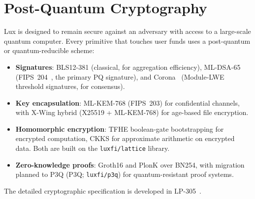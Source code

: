 \section{Post-Quantum Cryptography}


Lux is designed to remain secure against an adversary with access to
a large-scale quantum computer. Every primitive that touches user
funds uses a post-quantum or quantum-reducible scheme:

\begin{itemize}[nosep]
  \item \textbf{Signatures}: BLS12-381 (classical, for aggregation
        efficiency), ML-DSA-65 (FIPS~204~\cite{mldsa}, the primary
        PQ signature), and Corona~\cite{corona} (Module-LWE
        threshold signatures, for consensus).
  \item \textbf{Key encapsulation}: ML-KEM-768 (FIPS~203) for
        confidential channels, with X-Wing hybrid (X25519 +
        ML-KEM-768) for age-based file encryption.
  \item \textbf{Homomorphic encryption}: TFHE boolean-gate bootstrapping
        for encrypted computation, CKKS for approximate arithmetic on
        encrypted data. Both are built on the \texttt{luxfi/lattice}
        library.
  \item \textbf{Zero-knowledge proofs}: Groth16 and PlonK over
        BN254, with migration planned to P3Q
        (P3Q; \texttt{luxfi/p3q}) for quantum-resistant proof systems.
\end{itemize}

The detailed cryptographic specification is developed in
LP-305~\cite{lp-305}.


